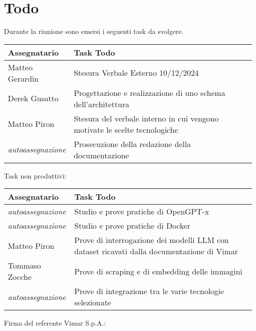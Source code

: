 \section{Todo}
Durante la riunione sono emersi i seguenti task da svolgere.

\begin{center}
  \begin{tabular}{|L{5cm}|L{8cm}|}
    \hline
    \textbf{Assegnatario} & \textbf{Task Todo} \\ \hline
    Matteo Gerardin   &  Stesura Verbale Esterno 10/12/2024\\ \hline
    Derek Gusatto & Progettazione e realizzazione di uno schema dell'architettura\\ \hline
    Matteo Piron & Stesura del verbale interno in cui vengono motivate le scelte tecnologiche\\ \hline
    \textit{autoassegnazione} & Prosecuzione della redazione della documentazione\\ \hline
  \end{tabular}
\end{center}

Task non produttivi:

\begin{center}
  \begin{tabular}{|L{5cm}|L{8cm}|}
    \hline
    \textbf{Assegnatario} & \textbf{Task Todo} \\ \hline
    \textit{autoassegnazione} & Studio e prove pratiche di OpenGPT-x\\ \hline
    \textit{autoassegnazione} & Studio e prove pratiche di Docker\\ \hline
    Matteo Piron & Prove di interrogazione dei modelli LLM con dataset ricavati dalla documentazione di Vimar\\ \hline
    Tommaso Zocche & Prove di scraping e di embedding delle immagini\\ \hline
    \textit{autoassegnazione} & Prove di integrazione tra le varie tecnologie selezionate\\ \hline
  \end{tabular}
\end{center}
\vspace{4cm}
\noindent Firma del referente Vimar S.p.A.: \underline{\hspace{5cm}}